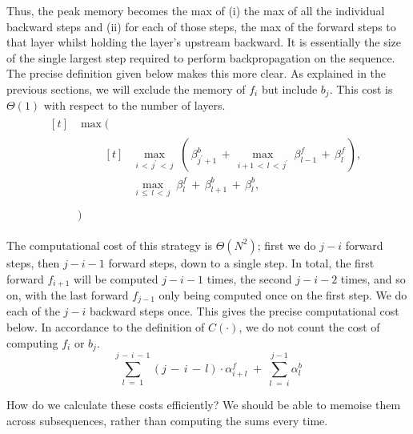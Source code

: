 Thus, the peak memory becomes the max of (i) the max of all the individual backward steps and (ii) for each of those steps, the max of the forward steps to that layer whilst holding the layer's upstream backward.
It is essentially the size of the single largest step required to perform backpropagation on the sequence.
The precise definition given below makes this more clear.
As explained in the previous sections, we will exclude the memory of \(f_i\) but include \(b_j\).
This cost is \(\Theta(1)\) with respect to the number of layers.
\begin{align} \label{eqn:3-peak-quad}
\begin{aligned}[t] %
    &\max(\\[0.25em]
    &\qquad\begin{aligned}[t]
        &\max_{i\,<\, j^\prime \,<\, j}\; (\,\beta^b_{j^\prime+1} \,+\, \max_{i+1\,<\, l \,<\,j^\prime}\; \beta^f_{l-1} \,+\, \beta^f_l \,), \\[0.5em]
        &\max_{i\,\leq\, l \,<\, j}\; \beta^f_l \,+\, \beta^b_{l+1} \,+\, \beta^b_l, \\[0.5em]
    \end{aligned} \\[0.25em]
     &)
\end{aligned}
\end{align}

The computational cost of this strategy is \(\Theta(N^2)\); first we do \(j-i\) forward steps, then \(j-i-1\) forward steps, down to a single step.
In total, the first forward \(f_{i+1}\) will be computed \(j-i-1\) times, the second \(j-i-2\) times, and so on, with the last forward \(f_{j-1}\) only being computed once on the first step.
We do each of the \(j-i\) backward steps once.
This gives the precise computational cost below.
In accordance to the definition of \(C(\cdot)\), we do not count the cost of computing \(f_i\) or \(b_j\).
\begin{equation} \label{eqn:3-comp-quad}
    \sum_{l\;=\;1}^{j\,-\,i\,-\,1} (j\,-\,i\,-\,l) \cdot \alpha^f_{i+l} \;+\; \sum_{l\;=\;i}^{j-1}\alpha^b_l
\end{equation}


How do we calculate these costs efficiently?
We should be able to memoise them across subsequences, rather than computing the sums every time.

